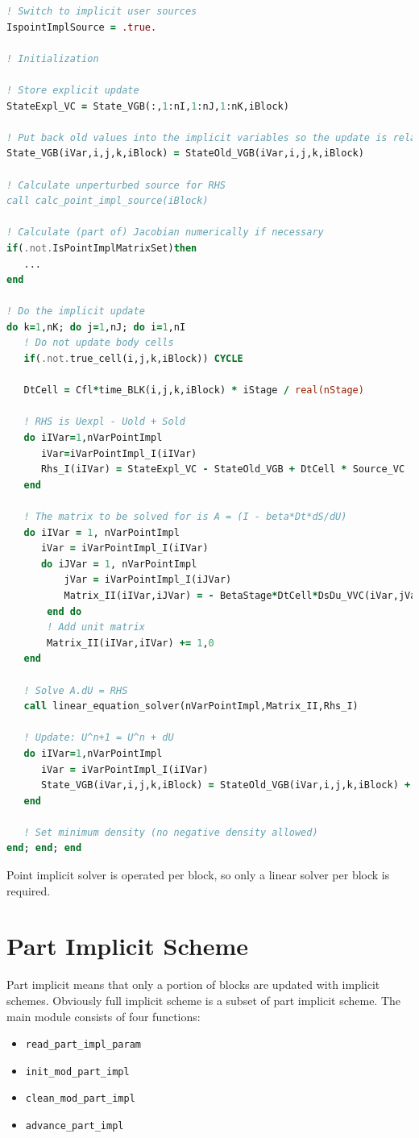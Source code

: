 \documentclass[11pt]{book} %
\begin{document}
\begin{lstlisting}[language=Fortran, caption=Point implicit scheme]
! Switch to implicit user sources
IspointImplSource = .true.

! Initialization

! Store explicit update
StateExpl_VC = State_VGB(:,1:nI,1:nJ,1:nK,iBlock)

! Put back old values into the implicit variables so the update is relative to time level n
State_VGB(iVar,i,j,k,iBlock) = StateOld_VGB(iVar,i,j,k,iBlock)

! Calculate unperturbed source for RHS
call calc_point_impl_source(iBlock)

! Calculate (part of) Jacobian numerically if necessary
if(.not.IsPointImplMatrixSet)then
   ...
end

! Do the implicit update
do k=1,nK; do j=1,nJ; do i=1,nI
   ! Do not update body cells
   if(.not.true_cell(i,j,k,iBlock)) CYCLE
   
   DtCell = Cfl*time_BLK(i,j,k,iBlock) * iStage / real(nStage)
   
   ! RHS is Uexpl - Uold + Sold
   do iIVar=1,nVarPointImpl
      iVar=iVarPointImpl_I(iIVar)
      Rhs_I(iIVar) = StateExpl_VC - StateOld_VGB + DtCell * Source_VC
   end
   
   ! The matrix to be solved for is A = (I - beta*Dt*dS/dU)
   do iIVar = 1, nVarPointImpl
      iVar = iVarPointImpl_I(iIVar)
      do iJVar = 1, nVarPointImpl
          jVar = iVarPointImpl_I(iJVar)
          Matrix_II(iIVar,iJVar) = - BetaStage*DtCell*DsDu_VVC(iVar,jVar,i,j,k)
       end do
       ! Add unit matrix
       Matrix_II(iIVar,iIVar) += 1,0
   end
   
   ! Solve A.dU = RHS
   call linear_equation_solver(nVarPointImpl,Matrix_II,Rhs_I)
   
   ! Update: U^n+1 = U^n + dU
   do iIVar=1,nVarPointImpl
      iVar = iVarPointImpl_I(iIVar)
      State_VGB(iVar,i,j,k,iBlock) = StateOld_VGB(iVar,i,j,k,iBlock) + Rhs_I(iIVar)
   end
  
   ! Set minimum density (no negative density allowed)
end; end; end

\end{lstlisting}

Point implicit solver is operated per block, so only a linear solver per block is required.


\section{Part Implicit Scheme}
Part implicit means that only a portion of blocks are updated with implicit schemes. Obviously full implicit scheme is a subset of part implicit scheme. The main module consists of four functions:
\begin{itemize}
\item \verb|read_part_impl_param|
\item \verb|init_mod_part_impl|
\item \verb|clean_mod_part_impl|
\item \verb|advance_part_impl|
\end{itemize}
\end{document}
